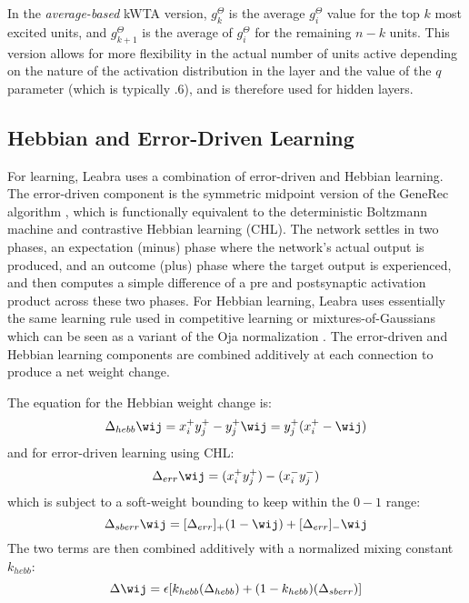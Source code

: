In the {\em average-based} kWTA version, $g^{\Theta}_k$ is the average $g_i^{\Theta}$ value for the top $k$ most excited units, and $g^{\Theta}_{k+1}$ is the average of $g_i^{\Theta}$ for the remaining $n-k$ units.  This version allows for more flexibility in the actual number of units active depending on the nature of the activation distribution in the layer and the value of the $q$ parameter (which is typically .6), and is therefore used for hidden layers.

\subsection{Hebbian and Error-Driven Learning} 

For learning, Leabra uses a combination of error-driven and Hebbian learning.  The error-driven component is the symmetric midpoint version of the GeneRec algorithm \cite{OReilly96}, which is functionally equivalent to the deterministic Boltzmann machine and contrastive Hebbian learning (CHL).  The network settles in two phases, an expectation (minus) phase where the network's actual output is produced, and an outcome (plus) phase where the target output is experienced, and then computes a simple difference of a pre and
postsynaptic activation product across these two phases.  For Hebbian learning, Leabra uses essentially the same learning rule used in competitive learning or mixtures-of-Gaussians which can be seen as a variant of the Oja normalization \cite{Oja82}.  The error-driven and Hebbian learning components are combined additively at each connection to produce a net weight change.

The equation for the Hebbian weight change is:
\begin{equation}
  \Delta_{hebb} \wij = x^+_i y^+_j - y^+_j \wij = y^+_j (x^+_i - \wij)
  \label{eq.hebb}
\end{equation}
and for error-driven learning using CHL:
\begin{equation}
  \Delta_{err} \wij = (x^+_i y^+_j) - (x^-_i y^-_j)
  \label{eq.err}
\end{equation}
which is subject to a soft-weight bounding to keep within the $0-1$ range:
\begin{equation}
  \Delta_{sberr} \wij = [\Delta_{err}]_+ (1-\wij) + [\Delta_{err}]_- \wij
  \label{eq.err_soft_bound}
\end{equation}
The two terms are then combined additively with a normalized mixing constant $k_{hebb}$:
\begin{equation}
  \Delta \wij = \epsilon[k_{hebb} (\Delta_{hebb}) + (1-k_{hebb}) (\Delta_{sberr})]
  \label{eq.k_hebb}
\end{equation}

